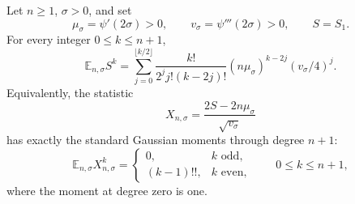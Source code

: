 \begin{theorem}
\label{gn:thm:gaussian}
Let $n\ge1$, $\sigma>0$, and set
\begin{equation}\label{gn:eq:mu-v}
 \mu_\sigma=\psi'(2\sigma)>0,\qquad
 v_\sigma=\psi'''(2\sigma)>0,
 \qquad S=S_1.
\end{equation}
For every integer $0\le k\le n+1$,
\begin{equation}\label{gn:eq:S-moments}
 \boxed{\displaystyle
 \mathbb E_{n,\sigma}S^k
 =\sum_{j=0}^{\lfloor k/2\rfloor}
       \frac{k!}{2^jj!(k-2j)!}
       (n\mu_\sigma)^{k-2j}(v_\sigma/4)^j.}
\end{equation}
Equivalently, the statistic
\begin{equation}\label{gn:eq:X}
             X_{n,\sigma}
       =\frac{2S-2n\mu_\sigma}{\sqrt{v_\sigma}}
\end{equation}
has exactly the standard Gaussian moments through degree $n+1$:
\begin{equation}\label{gn:eq:Gaussian-moments}
 \mathbb E_{n,\sigma}X_{n,\sigma}^{k}
 =\begin{cases}
    0,&k\text{ odd},\\[2pt]
    (k-1)!!,&k\text{ even},
   \end{cases}
 \qquad 0\le k\le n+1,
\end{equation}
where the moment at degree zero is one.
\end{theorem}

